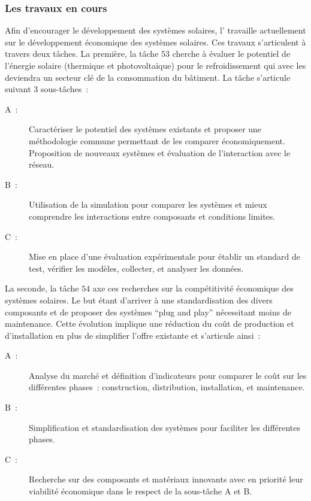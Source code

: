 \subsubsection{Les travaux en cours} %
\label{ssub:les_travaux_en_cours}
Afin d’encourager le développement des systèmes solaires, l’ travaille
actuellement sur le développement économique des systèmes solaires. Ces travaux s’articulent
à travers deux tâches. La première, la tâche $53$ cherche à évaluer le potentiel
de l’énergie solaire (thermique et photovoltaïque) pour le refroidissement qui
avec les  deviendra un secteur clé de la consommation du bâtiment.
La tâche s’articule suivant $3$ sous-tâches~:
\begin{description}
    \item[A~:] Caractériser le potentiel des systèmes existants et proposer une méthodologie
                commune permettant de les comparer économiquement. Proposition de nouveaux
                systèmes et évaluation de l’interaction avec le réseau.
    \item[B~:] Utilisation de la simulation pour comparer les systèmes et mieux
                comprendre les interactions entre composants et conditions limites.
    \item[C~:] Mise en place d’une évaluation expérimentale pour établir un standard
                de test, vérifier les modèles, collecter, et analyser les données.
\end{description}
La seconde, la tâche $54$ axe ces recherches sur la compétitivité économique des
systèmes solaires. Le but étant d’arriver à une standardisation des
divers composants et de proposer des systèmes \enquote{plug and play} nécessitant
moins de maintenance. Cette évolution implique une réduction du coût de production
et d’installation en plus de simplifier l’offre existante et s’articule ainsi~:
\begin{description}
    \item [A~:] Analyse du marché et définition d’indicateurs pour comparer le coût
                sur les différentes phases~: construction, distribution, installation, et maintenance.
    \item [B~:] Simplification et standardisation des systèmes pour faciliter les différentes
                phases.
    \item [C~:] Recherche sur des composants et matériaux innovants avec en priorité
                leur viabilité économique dans le respect de la sous-tâche A et B.
\end{description}
